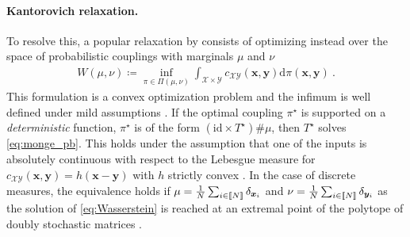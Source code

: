 \paragraph{Kantorovich relaxation.} To resolve this, a popular relaxation by \cite{kantorovich1942translocation} consists of optimizing instead over the space of probabilistic couplings with marginals $\mu$ and $\nu$
\begin{align}\label{eq:Wasserstein}
	W(\mu, \nu) \coloneqq \inf_{\pi \in \Pi(\mu, \nu)} \int_{\mathcal{X} \times \mathcal{Y}} c_{\mathcal{X} \mathcal{Y}}(\bm{x}, \bm{y}) \mathrm{d}\pi(\bm{x}, \bm{y}) \:.
\end{align}
This formulation is a convex optimization problem and the infimum is well
defined under mild assumptions \cite{santambrogio2015optimal}. If the optimal
coupling $\pi^\star$ is supported on a \emph{deterministic} function, \ie
$\pi^\star$ is of the form $(\mathrm{id} \times T^\star)\# \mu$, then
$T^\star$ solves \eqref{eq:monge_pb}. This holds under the assumption that one
of the inputs is absolutely continuous with respect to the Lebesgue measure
for $c_{\mathcal{X} \mathcal{Y}}(\bm{x}, \bm{y}) = h(\bm{x} - \bm{y})$ with
$h$ strictly convex \cite{gangbo1996geometry}. In the case of discrete
measures, the equivalence holds if $\mu = \frac{1}{N} \sum_{i \in {[\![N]\!]}}
\delta_{\bm{x}_i}$ and $\nu = \frac{1}{N} \sum_{i \in {[\![N]\!]}}
\delta_{\bm{y}_i}$ as the solution of \eqref{eq:Wasserstein} is reached at an
extremal point of the polytope of doubly stochastic matrices
\cite{bertsimas1997introduction}.

